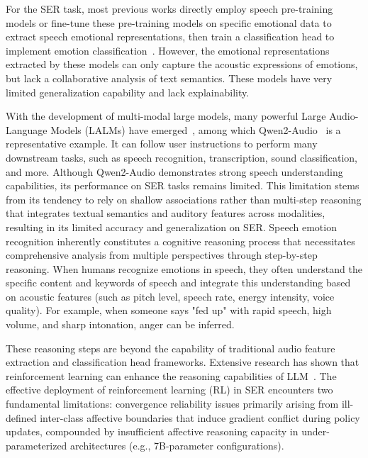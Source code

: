 \documentclass[11pt]{article}
\begin{document}
For the SER task, most previous works directly employ speech pre-training models or fine-tune these pre-training models on specific emotional data to extract speech emotional representations, then train a classification head to implement emotion classification~\citep{zou2022speech,chen2023dst,li2024multiscaletemporaltransformerspeech}. However, the emotional representations extracted by these models can only capture the acoustic expressions of emotions, but lack a collaborative analysis of text semantics. These models have very limited generalization capability and lack explainability.

With the development of multi-modal large models, many powerful Large Audio-Language Models (LALMs) have emerged~\citep{kong2024audio,tang2023salmonn}, among which Qwen2-Audio~\citep{chu2024qwen2} is a representative example.
It can follow user instructions to perform many downstream tasks, such as speech recognition, transcription, sound classification, and more. Although Qwen2-Audio demonstrates strong speech understanding capabilities, its performance on SER tasks remains limited.
This limitation stems from its tendency to rely on shallow associations rather than multi-step reasoning that integrates textual semantics and auditory features across modalities, resulting in its limited accuracy and generalization on SER.
Speech emotion recognition inherently constitutes a cognitive reasoning process that necessitates comprehensive analysis from multiple perspectives through step-by-step reasoning.
When humans recognize emotions in speech, they often understand the specific content and keywords of speech and integrate this understanding based on acoustic features (such as pitch level, speech rate, energy intensity, voice quality).
For example, when someone says "fed up" with rapid speech, high volume, and sharp intonation, anger can be inferred.

These reasoning steps are beyond the capability of traditional audio feature extraction and classification head frameworks.
Extensive research has shown that reinforcement learning can enhance the reasoning capabilities of LLM~\citep{guo2025deepseek,team2025kimi}.
The effective deployment of reinforcement learning (RL) in SER encounters two fundamental limitations: convergence reliability issues primarily arising from ill-defined inter-class affective boundaries that induce gradient conflict during policy updates, compounded by insufficient affective reasoning capacity in under-parameterized architectures (e.g., 7B-parameter configurations).
\end{document}

